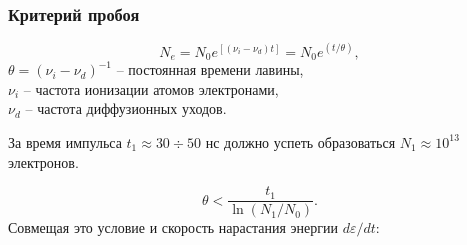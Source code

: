 \documentclass{beamer}
\begin{document}
	\begin{frame}
		\frametitle{Критерий пробоя}
		
		$$ N_e = N_0 e^{\left[(\nu_i - \nu_d) t\right]} = N_0 e^{(t/\theta)},$$
		$\theta = (\nu_i - \nu_d)^{-1}$ -- постоянная времени лавины,\\
		$\nu_i$ -- частота ионизации атомов электронами,\\
		$\nu_d$ -- частота диффузионных уходов.

		За время импульса $t_1 \approx 30 \div 50$ нс должно успеть образоваться $N_1 \approx 10^{13}$ электронов.
		
		$$ \theta < \frac{t_1}{\ln( N_1 / N_0)}.$$
		Совмещая это условие и скорость нарастания энергии $d\varepsilon/dt$:
		\begin{center}
		\end{center}
		


%		
%		
%		
%		
%		
%		
%		
%		
%		
%		
%		
	\end{frame}
\end{document}
